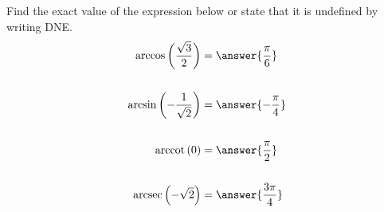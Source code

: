 \documentclass{ximera}
\author{Bobby Ramsey}
\begin{document}
\begin{exercise}


Find the exact value of the expression below or state that it is undefined by writing DNE.
\begin{align*}
	\arccos\left( \frac{\sqrt{3}}{2} \right) &= \answer{\frac{\pi}{6}} \\ \\
	\arcsin\left( -\frac{1}{\sqrt{2}} \right) &= \answer{ -\frac{\pi}{4} } \\ \\
	\arccot\left( 0 \right)&=\answer{ \frac{\pi}{2 } } \\ \\
	\arcsec\left( -\sqrt{2} \right) &= \answer{ \frac{3\pi}{4} } 
\end{align*}


\end{exercise}
\end{document}
